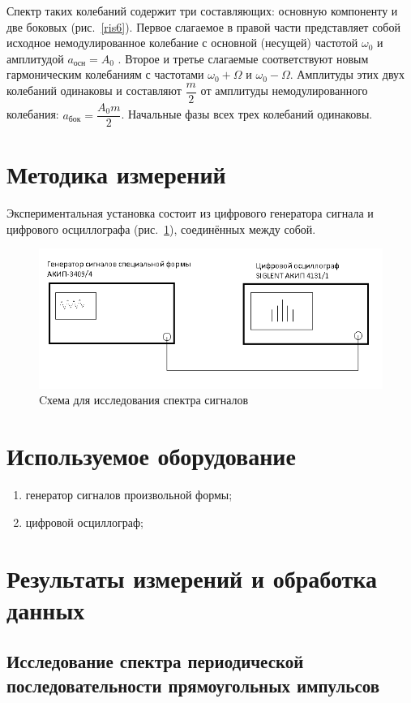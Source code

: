 \documentclass[a4paper, 12pt]{article}
\begin{document}
Спектр таких колебаний содержит три составляющих: основную компоненту и две боковых (рис.~\ref{ris6}). Первое слагаемое в правой части представляет собой исходное немодулированное колебание с основной (несущей) частотой $\omega_{0}$ и амплитудой $a_{осн} = A_{0}$ . Второе и третье слагаемые соответствуют новым гармоническим колебаниям с частотами $\omega_{0} + \Omega$ и $\omega_{0} - \Omega$. Амплитуды этих двух колебаний одинаковы и составляют $\dfrac{m}{2}$ от амплитуды немодулированного колебания:
$a_{бок} = \dfrac{A_{0}m}{2}$. Начальные фазы всех трех колебаний одинаковы.

\section{Методика измерений}

Экспериментальная установка состоит из цифрового генератора сигнала и цифрового осциллографа (рис.~\ref{A}), соединённых между собой.
					
\begin{figure}[h!]
	\centering
	\includegraphics[width=0.8\linewidth]{sp7.png}
	\caption{Cхема для исследования спектра сигналов}
	\label{A}
\end{figure}

\section{Используемое оборудование}

\begin{enumerate}
    \item генератор сигналов произвольной формы;
    \item цифровой осциллограф;
\end{enumerate}

\section{Результаты измерений и обработка данных}

\subsection{Исследование спектра периодической последовательности прямоугольных импульсов}
\end{document}
